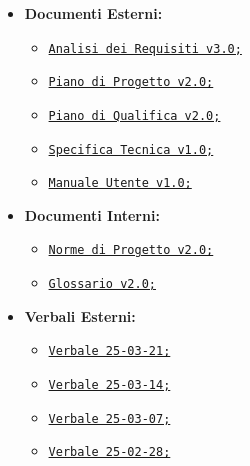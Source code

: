 \documentclass{article}
\begin{document}
\begin{itemize}
     \item \textbf{Documenti Esterni:}
        \begin{itemize}
            \item \href{https://code7crusaders.github.io/docs/PB/documentazione_esterna/analisi_dei_requisiti.html}{\texttt{Analisi dei Requisiti v3.0;}}
            \item \href{https://code7crusaders.github.io/docs/PB/documentazione_esterna/piano_di_progetto.html}{\texttt{Piano di Progetto v2.0;}}
            \item \href{https://code7crusaders.github.io/docs/PB/documentazione_esterna/piano_di_qualifica.html}{\texttt{Piano di Qualifica v2.0;}}
            \item \href{https://code7crusaders.github.io/docs/PB/documentazione_esterna/specifica_tecnica.html}{\texttt{Specifica Tecnica v1.0;}}
            \item \href{https://code7crusaders.github.io/docs/PB/documentazione_esterna/manuale_utente.html}{\texttt{Manuale Utente v1.0;}}
        \end{itemize}
        \item \textbf{Documenti Interni:}
        \begin{itemize}
            \item \href{https://code7crusaders.github.io/docs/PB/documentazione_interna/norme_di_progetto.html}{\texttt{Norme di Progetto v2.0;}}
            \item \href{https://code7crusaders.github.io/docs/PB/documentazione_interna/glossario.html}{\texttt{Glossario v2.0;}}
        \end{itemize}
        \item \textbf{Verbali Esterni:}
        \begin{itemize}
            \item \href{https://code7crusaders.github.io/docs/PB/verbale_interno/verbale_25-03-21.html}{\texttt{Verbale 25-03-21;}}
            \item \href{https://code7crusaders.github.io/docs/PB/verbale_interno/verbale_25-03-14.html}{\texttt{Verbale 25-03-14;}}
            \item \href{https://code7crusaders.github.io/docs/PB/verbale_interno/verbale_25-03-07.html}{\texttt{Verbale 25-03-07;}}
            \item \href{https://code7crusaders.github.io/docs/PB/verbale_interno/verbale_25-02-28.html}{\texttt{Verbale 25-02-28;}}
        \end{itemize}

\end{itemize}
\end{document}
